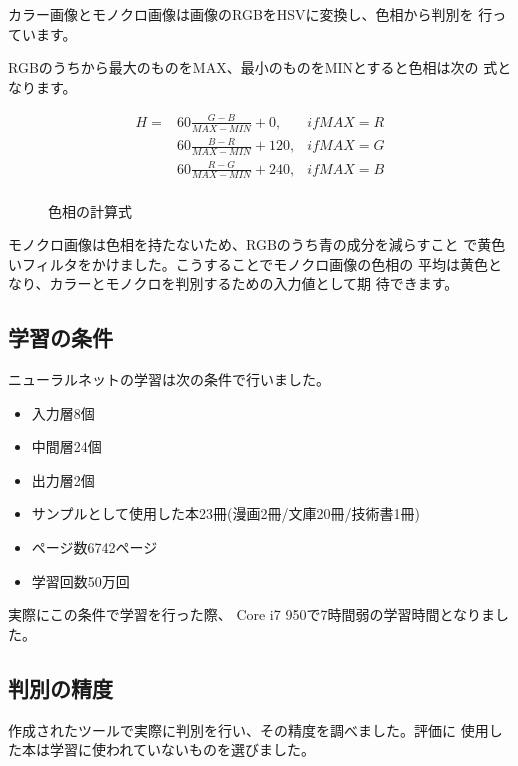 \documentclass[mingoth,a4paper]{jsarticle}
\begin{document}
カラー画像とモノクロ画像は画像のRGBをHSVに変換し、色相から判別を
行っています。

RGBのうちから最大のものをMAX、最小のものをMINとすると色相は次の
式となります。

\begin{figure}[H]
\begin{center}
\caption{色相の計算式}

\begin{align*}
 H = & 60 \frac{G-B}{MAX-MIN} + 0, & if MAX = R\\
     & 60 \frac{B-R}{MAX-MIN} + 120,   & if MAX = G\\
     & 60 \frac{R-G}{MAX-MIN} + 240,   & if MAX = B\\
\end{align*}
\end{center}
\end{figure}

モノクロ画像は色相を持たないため、RGBのうち青の成分を減らすこと
で黄色いフィルタをかけました。こうすることでモノクロ画像の色相の
平均は黄色となり、カラーとモノクロを判別するための入力値として期
待できます。

\subsection{学習の条件}

ニューラルネットの学習は次の条件で行いました。

\begin{itemize}
\item 入力層8個
\item 中間層24個
\item 出力層2個
\item サンプルとして使用した本23冊(漫画2冊/文庫20冊/技術書1冊)
\item ページ数6742ページ
\item 学習回数50万回
\end{itemize}

実際にこの条件で学習を行った際、
Core i7 950で7時間弱の学習時間となりました。

\subsection{判別の精度}

作成されたツールで実際に判別を行い、その精度を調べました。評価に
使用した本は学習に使われていないものを選びました。
\end{document}
